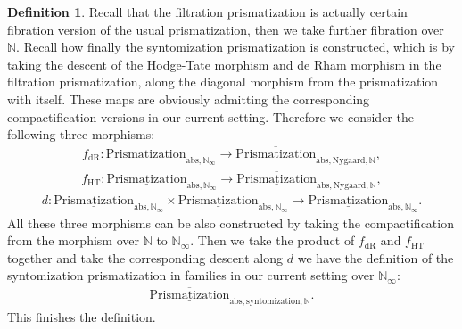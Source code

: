 \documentclass[12pt]{article}
\theoremstyle{definition}
\newtheorem{definition}{Definition}
\begin{document}
\begin{definition}
Recall that the filtration prismatization is actually certain fibration version of the usual prismatization, then we take further fibration over $\mathbb{N}$. Recall how finally the syntomization prismatization is constructed, which is by taking the descent of the Hodge-Tate morphism and de Rham morphism in the filtration prismatization, along the diagonal morphism from the prismatization with itself. These maps are obviously admitting the corresponding compactification versions in our current setting. Therefore we consider the following three morphisms:
\begin{align}
f_\mathrm{dR}: {\underline{\mathrm{Prismatization}}}_{\mathrm{abs},\mathbb{N}_\infty}\rightarrow \overline{\underline{\mathrm{Prismatization}}}_{\mathrm{abs},\mathrm{Nygaard},\mathbb{N}},
\end{align}
\begin{align}
f_\mathrm{HT}: {\underline{\mathrm{Prismatization}}}_{\mathrm{abs},\mathbb{N}_\infty}\rightarrow \overline{\underline{\mathrm{Prismatization}}}_{\mathrm{abs},\mathrm{Nygaard},\mathbb{N}},
\end{align}
\begin{align}
d:  {\underline{\mathrm{Prismatization}}}_{\mathrm{abs},\mathbb{N}_\infty}\times {\underline{\mathrm{Prismatization}}}_{\mathrm{abs},\mathbb{N}_\infty} \rightarrow {\underline{\mathrm{Prismatization}}}_{\mathrm{abs},\mathbb{N}_\infty}.
\end{align}
All these three morphisms can be also constructed by taking the compactification from the morphism over $\mathbb{N}$ to $\mathbb{N}_\infty$. Then we take the product of $f_\mathrm{dR}$ and $f_\mathrm{HT}$ together and take the corresponding descent along $d$ we have the definition of the syntomization prismatization in families in our current setting over $\mathbb{N}_\infty$:
\begin{align}
\overline{\underline{\mathrm{Prismatization}}}_{\mathrm{abs},\mathrm{syntomization},\mathbb{N}}. 
\end{align}
This finishes the definition. 
\end{definition}
\end{document}
